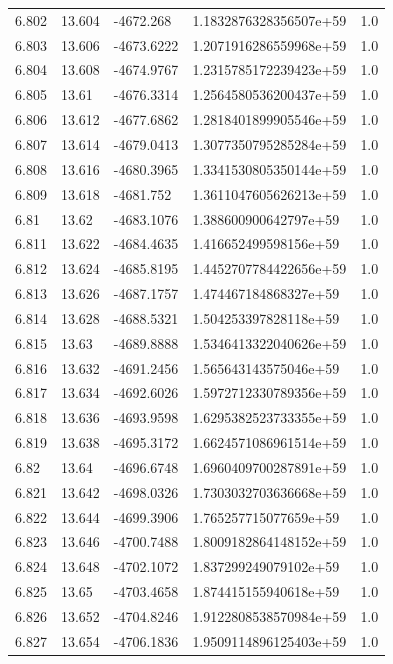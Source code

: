\begin{tabular}{lllll}
6.802 & 13.604 & -4672.268 & 1.1832876328356507e+59 & 1.0 \\
6.803 & 13.606 & -4673.6222 & 1.2071916286559968e+59 & 1.0 \\
6.804 & 13.608 & -4674.9767 & 1.2315785172239423e+59 & 1.0 \\
6.805 & 13.61 & -4676.3314 & 1.2564580536200437e+59 & 1.0 \\
6.806 & 13.612 & -4677.6862 & 1.2818401899905546e+59 & 1.0 \\
6.807 & 13.614 & -4679.0413 & 1.3077350795285284e+59 & 1.0 \\
6.808 & 13.616 & -4680.3965 & 1.3341530805350144e+59 & 1.0 \\
6.809 & 13.618 & -4681.752 & 1.3611047605626213e+59 & 1.0 \\
6.81 & 13.62 & -4683.1076 & 1.388600900642797e+59 & 1.0 \\
6.811 & 13.622 & -4684.4635 & 1.416652499598156e+59 & 1.0 \\
6.812 & 13.624 & -4685.8195 & 1.4452707784422656e+59 & 1.0 \\
6.813 & 13.626 & -4687.1757 & 1.474467184868327e+59 & 1.0 \\
6.814 & 13.628 & -4688.5321 & 1.504253397828118e+59 & 1.0 \\
6.815 & 13.63 & -4689.8888 & 1.5346413322040626e+59 & 1.0 \\
6.816 & 13.632 & -4691.2456 & 1.565643143575046e+59 & 1.0 \\
6.817 & 13.634 & -4692.6026 & 1.5972712330789356e+59 & 1.0 \\
6.818 & 13.636 & -4693.9598 & 1.6295382523733355e+59 & 1.0 \\
6.819 & 13.638 & -4695.3172 & 1.6624571086961514e+59 & 1.0 \\
6.82 & 13.64 & -4696.6748 & 1.6960409700287891e+59 & 1.0 \\
6.821 & 13.642 & -4698.0326 & 1.7303032703636668e+59 & 1.0 \\
6.822 & 13.644 & -4699.3906 & 1.765257715077659e+59 & 1.0 \\
6.823 & 13.646 & -4700.7488 & 1.8009182864148152e+59 & 1.0 \\
6.824 & 13.648 & -4702.1072 & 1.837299249079102e+59 & 1.0 \\
6.825 & 13.65 & -4703.4658 & 1.874415155940618e+59 & 1.0 \\
6.826 & 13.652 & -4704.8246 & 1.9122808538570984e+59 & 1.0 \\
6.827 & 13.654 & -4706.1836 & 1.9509114896125403e+59 & 1.0 \\

\end{tabular}

